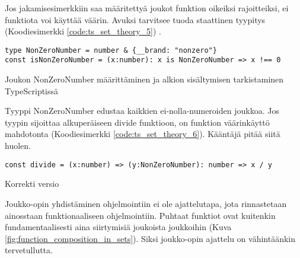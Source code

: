 Jos jakamisesimerkkiin saa määritettyä joukot funktion oikeiksi rajoitteiksi, ei funktiota voi käyttää väärin. Avuksi tarvitsee tuoda staattinen tyypitys   (Koodiesimerkki \ref{code:ts_set_theory_5}) \cite{typsecript_website}.

\begin{code}
    \begin{verbatim}
type NonZeroNumber = number & {__brand: "nonzero"}
const isNonZeroNumber = (x:number): x is NonZeroNumber => x !== 0
\end{verbatim}
    \caption{Joukon NonZeroNumber määrittäminen ja alkion sisältymisen tarkistaminen TypeScriptissä}
    \label{code:ts_set_theory_5}
\end{code}

Tyyppi NonZeroNumber edustaa kaikkien ei-nolla-numeroiden joukkoa. Jos tyypin sijoittaa alkuperäiseen divide funktioon, on funktion väärinkäyttö mahdotonta (Koodiesimerkki \ref{code:ts_set_theory_6}). Kääntäjä pitää siitä huolen.


\begin{code}
    \begin{verbatim}
const divide = (x:number) => (y:NonZeroNumber): number => x / y
\end{verbatim}
    \caption{Korrekti versio}
    \label{code:ts_set_theory_6}
\end{code}

Joukko-opin yhdistäminen ohjelmointiin ei ole ajattelutapa, jota rinnastetaan ainosstaan funktionaaliseen ohjelmointiin. Puhtaat funktiot ovat kuitenkin fundamentaalisesti aina siirtymisiä joukoista joukkoihin (Kuva \ref{fig:function_composition_in_sets}). Siksi joukko-opin ajattelu on vähintäänkin tervetullutta.

